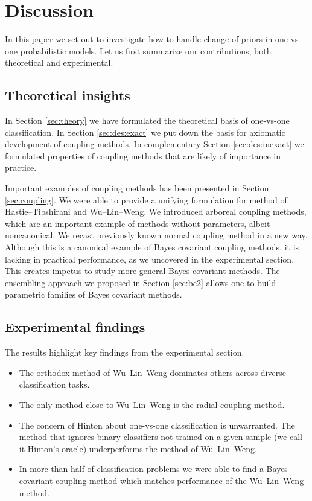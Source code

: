 \section{Discussion}

In this paper we set out to investigate how to handle change of priors in one-vs-one probabilistic models. Let us first summarize our contributions, both theoretical and experimental.

\subsection{Theoretical insights}

In Section \ref{sec:theory} we have formulated the theoretical basis of one-vs-one classification. In Section \ref{sec:des:exact} we put down the basis for axiomatic development of coupling methods. In complementary Section \ref{sec:des:inexact} we formulated properties of coupling methods that are likely of importance in practice.

Important examples of coupling methods has been presented in Section \ref{sec:coupling}. We were able to provide a unifying formulation for method of Hastie--Tibshirani and Wu--Lin--Weng. We introduced arboreal coupling methods, which are an important example of methods without parameters, albeit noncanonical. We recast previously known normal coupling method in a new way. Although this is a canonical example of Bayes covariant coupling methods,  it is lacking in practical performance, as  we uncovered in the experimental section. This creates impetus to study more general Bayes covariant methods. The  ensembling approach we proposed in Section \ref{sec:bc2} allows one to build parametric families of Bayes covariant methods.

\subsection{Experimental findings} 

The results highlight key findings from the experimental section.

\begin{itemize}
	\item The orthodox method of Wu--Lin--Weng dominates others across diverse classification tasks.
	\item The only method close to Wu--Lin--Weng is the radial coupling method.
	\item The concern of Hinton about one-vs-one classification is unwarranted. The method that ignores binary classifiers not trained on a given sample (we call it Hinton's oracle) underperforms the method of Wu--Lin--Weng.
	\item In more than half of classification problems we were able to find a Bayes covariant coupling method which matches performance of the Wu--Lin--Weng method. 
\end{itemize}



